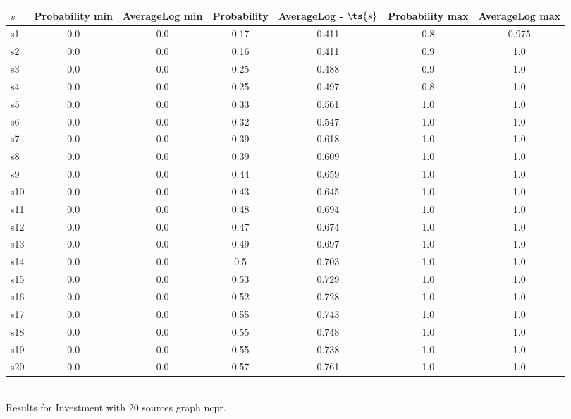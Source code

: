 \documentclass{article}
\begin{document}
\noindent\begin{tabular}{|l|c|c|c|c|c|c|}
\hline
$s$& Probability min & AverageLog min & Probability & AverageLog - $\ts{s}$ & Probability max & AverageLog max\\
\hline
s1 &0.0 & 0.0 & 0.17 & 0.411 & 0.8 & 0.975\\
\hline
s2 &0.0 & 0.0 & 0.16 & 0.411 & 0.9 & 1.0\\
\hline
s3 &0.0 & 0.0 & 0.25 & 0.488 & 0.9 & 1.0\\
\hline
s4 &0.0 & 0.0 & 0.25 & 0.497 & 0.8 & 1.0\\
\hline
s5 &0.0 & 0.0 & 0.33 & 0.561 & 1.0 & 1.0\\
\hline
s6 &0.0 & 0.0 & 0.32 & 0.547 & 1.0 & 1.0\\
\hline
s7 &0.0 & 0.0 & 0.39 & 0.618 & 1.0 & 1.0\\
\hline
s8 &0.0 & 0.0 & 0.39 & 0.609 & 1.0 & 1.0\\
\hline
s9 &0.0 & 0.0 & 0.44 & 0.659 & 1.0 & 1.0\\
\hline
s10 &0.0 & 0.0 & 0.43 & 0.645 & 1.0 & 1.0\\
\hline
s11 &0.0 & 0.0 & 0.48 & 0.694 & 1.0 & 1.0\\
\hline
s12 &0.0 & 0.0 & 0.47 & 0.674 & 1.0 & 1.0\\
\hline
s13 &0.0 & 0.0 & 0.49 & 0.697 & 1.0 & 1.0\\
\hline
s14 &0.0 & 0.0 & 0.5 & 0.703 & 1.0 & 1.0\\
\hline
s15 &0.0 & 0.0 & 0.53 & 0.729 & 1.0 & 1.0\\
\hline
s16 &0.0 & 0.0 & 0.52 & 0.728 & 1.0 & 1.0\\
\hline
s17 &0.0 & 0.0 & 0.55 & 0.743 & 1.0 & 1.0\\
\hline
s18 &0.0 & 0.0 & 0.55 & 0.748 & 1.0 & 1.0\\
\hline
s19 &0.0 & 0.0 & 0.55 & 0.738 & 1.0 & 1.0\\
\hline
s20 &0.0 & 0.0 & 0.57 & 0.761 & 1.0 & 1.0\\
\hline
\end{tabular}\\

\noindent Results for Investment with 20 sources graph ncpr.
\end{document}

